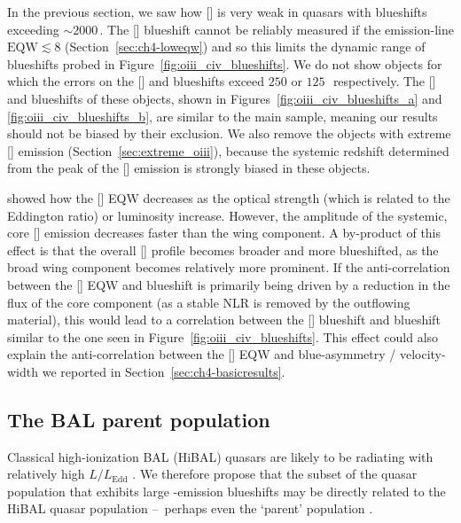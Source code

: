 In the previous section, we saw how [] is very weak in quasars with  blueshifts exceeding $\sim2000$\,\kms. 
The [] blueshift cannot be reliably measured if the emission-line $\text{EQW} \lesssim 8$ (Section~\ref{sec:ch4-loweqw}) and so this limits the dynamic range of  blueshifts probed in Figure~\ref{fig:oiii_civ_blueshifts}. 
We do not show objects for which the errors on the [] and  blueshifts exceed $250$ or $125$\,\kms\, respectively. 
The [] and  blueshifts of these objects, shown in Figures~\ref{fig:oiii_civ_blueshifts_a} and \ref{fig:oiii_civ_blueshifts_b}, are similar to the main sample, meaning our results should not be biased by their exclusion.  
We also remove the objects with extreme [] emission (Section~\ref{sec:extreme_oiii}), because the systemic redshift determined from the peak of the [] emission is strongly biased in these objects. 

\citet{shen14} showed how the [] EQW decreases as the optical  strength (which is related to the Eddington ratio) or luminosity increase. 
However, the amplitude of the systemic, core [] emission decreases faster than the wing component.
A by-product of this effect is that the overall [] profile becomes broader and more blueshifted, as the broad wing component becomes relatively more prominent.
If the anti-correlation between the [] EQW and  blueshift is primarily being driven by a reduction in the flux of the core component (as a stable NLR is removed by the outflowing material), this would lead to a correlation between the [] blueshift and  blueshift similar to the one seen in Figure~\ref{fig:oiii_civ_blueshifts}. 
This effect could also explain the anti-correlation between the [] EQW and blue-asymmetry / velocity-width we reported in Section~\ref{sec:ch4-basicresults}. 

\subsection{The BAL parent population}

Classical high-ionization BAL (HiBAL) quasars are likely to be radiating with relatively high $L/L_{\text{Edd}}$ \citep[e.g.][]{zhang14}. 
We therefore propose that the subset of the quasar population that exhibits large -emission blueshifts may be directly related to the HiBAL quasar population \---\ perhaps even the `parent' population \citep{richards06conf}. 

